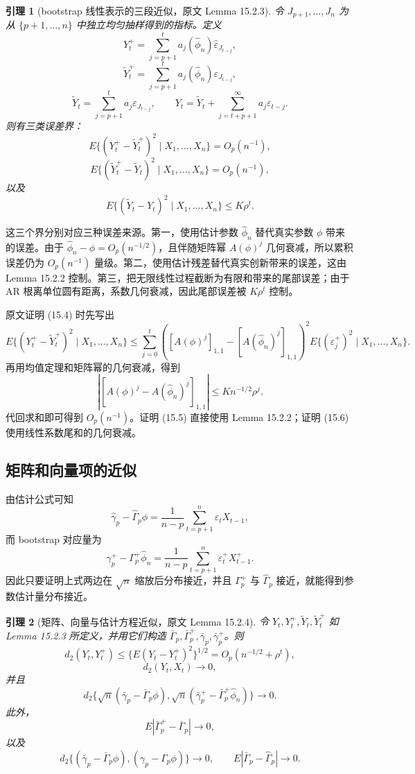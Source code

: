 \documentclass[11pt,a4paper,openany]{ctexbook}
\newtheorem{lemma}{引理}[section]
\begin{document}
\begin{lemma}[bootstrap 线性表示的三段近似，原文 Lemma 15.2.3]
令 \(J_{p+1},\ldots,J_n\) 为从 \(\{p+1,\ldots,n\}\) 中独立均匀抽样得到的指标。定义
\[
  Y_t^+=\sum_{j=p+1}^t a_j(\hat\phi_n)\hat\varepsilon_{J_{t-j}},
\]
\[
  \widetilde Y_t^+=\sum_{j=p+1}^t a_j(\hat\phi_n)\varepsilon_{J_{t-j}},
\]
\[
  \widetilde Y_t=\sum_{j=p+1}^t a_j\varepsilon_{J_{t-j}},
  \qquad
  Y_t=\widetilde Y_t+\sum_{j=t+p+1}^{\infty}a_j\varepsilon_{t-j}.
\]
则有三类误差界：
\[
  E\{(Y_t^+-\widetilde Y_t^+)^2\mid X_1,\ldots,X_n\}=O_p(n^{-1}),
  \tag{15.4}
\]
\[
  E\{(\widetilde Y_t^+-\widetilde Y_t)^2\mid X_1,\ldots,X_n\}=O_p(n^{-1}),
  \tag{15.5}
\]
以及
\[
  E\{(\widetilde Y_t-Y_t)^2\mid X_1,\ldots,X_n\}\le K\rho^t.
  \tag{15.6}
\]
\end{lemma}

这三个界分别对应三种误差来源。第一，使用估计参数 \(\hat\phi_n\) 替代真实参数 \(\phi\) 带来的误差。由于 \(\hat\phi_n-\phi=O_p(n^{-1/2})\)，且伴随矩阵幂 \(A(\phi)^j\) 几何衰减，所以累积误差仍为 \(O_p(n^{-1})\) 量级。第二，使用估计残差替代真实创新带来的误差，这由 Lemma 15.2.2 控制。第三，把无限线性过程截断为有限和带来的尾部误差；由于 AR 根离单位圆有距离，系数几何衰减，因此尾部误差被 \(K\rho^t\) 控制。

原文证明 (15.4) 时先写出
\[
  E\{(Y_t^+-\widetilde Y_t^+)^2\mid X_1,\ldots,X_n\}
  \le
  \sum_{j=0}^t
  \left([A(\phi)^j]_{1,1}-[A(\hat\phi_n)^j]_{1,1}\right)^2
  E\{(\varepsilon_j^+)^2\mid X_1,\ldots,X_n\}.
\]
再用均值定理和矩阵幂的几何衰减，得到
\[
  |[A(\phi)^j-A(\hat\phi_n)^j]_{1,1}|
  \le K n^{-1/2}\rho^j.
\]
代回求和即可得到 \(O_p(n^{-1})\)。证明 (15.5) 直接使用 Lemma 15.2.2；证明 (15.6) 使用线性系数尾和的几何衰减。

\subsection{矩阵和向量项的近似}

由估计公式可知
\[
  \hat\gamma_p-\hat\Gamma_p\phi
  =\frac1{n-p}\sum_{t=p+1}^n\varepsilon_tX_{t-1},
\]
而 bootstrap 对应量为
\[
  \gamma_p^+-\Gamma_p^+\hat\phi_n
  =\frac1{n-p}\sum_{t=p+1}^n\varepsilon_t^+X_{t-1}^+.
  \tag{15.10}
\]
因此只要证明上式两边在 \(\sqrt n\) 缩放后分布接近，并且 \(\Gamma_p^+\) 与 \(\hat\Gamma_p\) 接近，就能得到参数估计量分布接近。

\begin{lemma}[矩阵、向量与估计方程近似，原文 Lemma 15.2.4]
令 \(Y_t,Y_t^+,\widetilde Y_t,\widetilde Y_t^+\) 如 Lemma 15.2.3 所定义，并用它们构造 \(\bar\Gamma_p,\bar\Gamma_p^+,\bar\gamma_p,\bar\gamma_p^+\)。则
\[
  d_2(Y_t,Y_t^+)\le \{E(Y_t-Y_t^+)^2\}^{1/2}
  =O_p(n^{-1/2}+\rho^t),
  \tag{15.11}
\]
\[
  d_2(Y_t,X_t)\to0,
  \tag{15.12}
\]
并且
\[
  d_2\{\sqrt n(\bar\gamma_p-\bar\Gamma_p\phi),
        \sqrt n(\bar\gamma_p^+-\bar\Gamma_p^+\hat\phi_n)\}\to0.
  \tag{15.13}
\]
此外，
\[
  E|\bar\Gamma_p^+-\bar\Gamma_p|\to0,
  \tag{15.14}
\]
以及
\[
  d_2\{(\bar\gamma_p-\bar\Gamma_p\phi),
       (\gamma_p-\Gamma_p\phi)\}\to0,\qquad
  E|\bar\Gamma_p-\hat\Gamma_p|\to0.
  \tag{15.15}
\]
\end{lemma}
\end{document}
